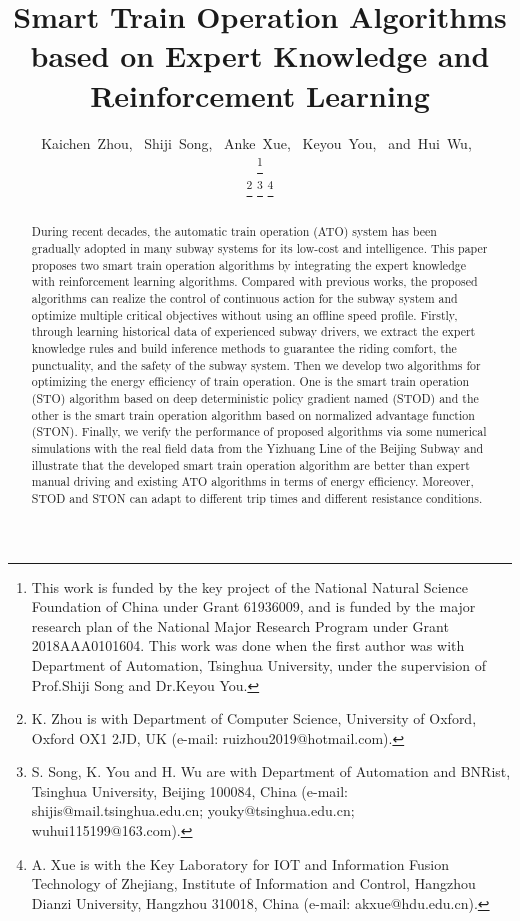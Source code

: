 \documentclass[journal]{IEEEtran}
\title{Smart Train Operation Algorithms based on Expert Knowledge and Reinforcement Learning}
\begin{document}
\author{Kaichen~Zhou,~
        Shiji~Song,~
        Anke~Xue,~
        Keyou~You,~
        and~Hui~Wu,~
    
\thanks{This work is funded by the key project of the National Natural Science Foundation of China under Grant 61936009, and is funded by the major research plan of the National Major Research Program under Grant 2018AAA0101604. This work was done when the first author was with Department of Automation, Tsinghua University, under the supervision of Prof.Shiji Song and Dr.Keyou You.}


\thanks{K. Zhou is with Department of Computer Science, University of Oxford, Oxford OX1 2JD, UK (e-mail: ruizhou2019@hotmail.com).}
\thanks{S. Song, K. You and H. Wu are with Department of Automation and BNRist, Tsinghua University, Beijing 100084, China (e-mail: shijis@mail.tsinghua.edu.cn; youky@tsinghua.edu.cn; wuhui115199@163.com).}
\thanks{A. Xue is with the Key Laboratory for IOT and Information Fusion Technology of Zhejiang, Institute of Information and Control, Hangzhou Dianzi University, Hangzhou 310018, China (e-mail: akxue@hdu.edu.cn).}}
\maketitle
\thispagestyle{fancy}


\begin{abstract}
During recent decades, the automatic train operation (ATO) system has been gradually adopted in many subway systems for its low-cost and intelligence.  This paper proposes two smart train operation algorithms by integrating the expert knowledge with reinforcement learning algorithms. Compared with previous works, the proposed algorithms can realize the control of continuous action for the subway system and optimize multiple critical objectives without using an offline speed profile. Firstly, through learning historical data of experienced subway drivers, we extract the expert knowledge rules and build inference methods to guarantee the riding comfort, the punctuality, and the safety of the subway system. Then we develop two algorithms for optimizing the energy efficiency of train operation. One is the smart train operation (STO) algorithm based on deep deterministic policy gradient named (STOD) and the other is the smart train operation algorithm based on normalized advantage function (STON). Finally, we verify the performance of proposed algorithms via some numerical simulations with the real field data from the Yizhuang Line of the Beijing Subway and illustrate that the developed smart train operation algorithm are better than expert manual driving and existing ATO algorithms in terms of energy efficiency. Moreover, STOD and STON can adapt to different trip times and different resistance conditions.
\end{abstract}
\end{document}
